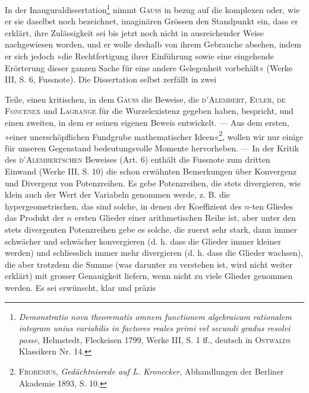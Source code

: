 \bigskip
\begin{center}\end{center}
\indent In der Inauguraldissertation\footnote{\textit{Demonstratio nova theorematis omnem functionem algebraicam rationalem integram unius variabilis in factores reales primi vel secundi gradus resolvi posse}, Helmstedt, Fleckeisen 1799, Werke III, S. 1 ff.,
deutsch in \textsc{Ostwalds} Klassikern Nr. 14.} nimmt \textsc{Gauss} in bezug auf die komplexen
oder, wie er sie daselbst noch bezeichnet, imaginären Grössen den Standpunkt
ein, dass er erklärt, ihre Zulässigkeit sei bis jetzt noch nicht in ausreichender
Weise nachgewiesen worden, und er wolle deshalb von ihrem Gebrauche absehen,
indem er sich jedoch »die Rechtfertigung ihrer Einführung sowie eine
eingehende Erörterung dieser ganzen Sache für eine andere Gelegenheit vorbehält«
(Werke III, S. 6, Fussnote). Die Dissertation selbst zerfällt in zwei\par
\clearpage{}
\noindent Teile, einen kritischen, in dem \textsc{Gauss} die Beweise, die \textsc{d’Alembert}, \textsc{Euler},
\textsc{de Foncenex} und \textsc{Lagrange} für die Wurzelexistenz gegeben haben, bespricht,
und einen zweiten, in dem er seinen eigenen Beweis entwickelt. — Aus dem
ersten, »einer unerschöpflichen Fundgrube mathematischer Ideen«\footnote{\textsc{Frobenius}, \textit{Gedächtnisrede auf L. Kronecker}, Abhandlungen der Berliner Akademie 1893, S. 10.}, wollen
wir nur einige für unseren Gegenstand bedeutungsvolle Momente hervorheben.
— In der Kritik des \textsc{d’Alembertschen} Beweises (Art. 6) enthält die Fussnote
zum dritten Einwand (Werke III, S. 10) die schon erwähnten Bemerkungen
über Konvergenz und Divergenz von Potenzreihen. Es gebe Potenzreihen, die
stets divergieren, wie klein auch der Wert der Variabeln genommen werde,
z. B. die hypergeometrischen, das sind solche, in denen der Koeffizient des
\(n\)-ten Gliedes das Produkt der \(n\) ersten Glieder einer arithmetischen Reihe
ist, aber unter den stets divergenten Potenzreihen gebe es solche, die zuerst
sehr stark, dann immer schwächer und schwächer konvergieren (d. h. dass
die Glieder immer kleiner werden) und schliesslich immer mehr divergieren (d. h.
dass die Glieder wachsen), die aber trotzdem die Summe (was darunter zu
verstehen ist, wird nicht weiter erklärt) mit grosser Genauigkeit liefern, wenn
nicht zu viele Glieder genommen werden. Es sei erwünscht, klar und präzis
